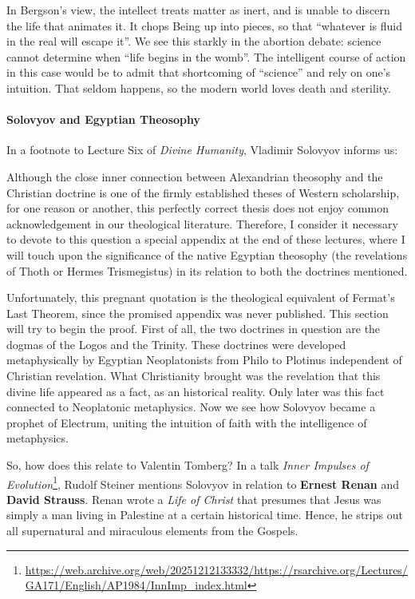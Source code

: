 In Bergson's view, the intellect treats matter as inert, and is unable to discern the life that animates it. It chops Being up into pieces, so that ``whatever is fluid in the real will escape it''. We see this starkly in the abortion debate: science cannot determine when ``life begins in the womb''. The intelligent course of action in this case would be to admit that shortcoming of ``science'' and rely on one's intuition. That seldom happens, so the modern world loves death and sterility.

\paragraph{Solovyov and Egyptian Theosophy}


In a footnote to Lecture Six of \emph{Divine Humanity}, Vladimir Solovyov informs us:

\begin{quotex}
Although the close inner connection between Alexandrian theosophy and the Christian doctrine is one of the firmly established theses of Western scholarship, for one reason or another, this perfectly correct thesis does not enjoy common acknowledgement in our theological literature. Therefore, I consider it necessary to devote to this question a special appendix at the end of these lectures, where I will touch upon the significance of the native Egyptian theosophy (the revelations of Thoth or Hermes Trismegistus) in its relation to both the doctrines mentioned.
\end{quotex}


Unfortunately, this pregnant quotation is the theological equivalent of Fermat's Last Theorem, since the promised appendix was never published. This section will try to begin the proof. First of all, the two doctrines in question are the dogmas of the Logos and the Trinity. These doctrines were developed metaphysically by Egyptian Neoplatonists from Philo to Plotinus independent of Christian revelation. What Christianity brought was the revelation that this divine life appeared as a fact, as an historical reality. Only later was this fact connected to Neoplatonic metaphysics. Now we see how Solovyov became a prophet of Electrum, uniting the intuition of faith with the intelligence of metaphysics.

So, how does this relate to Valentin Tomberg? In a talk \textit{Inner Impulses of Evolution}\footnote{\url{https://web.archive.org/web/20251212133332/https://rsarchive.org/Lectures/GA171/English/AP1984/InnImp_index.html}}, Rudolf Steiner mentions Solovyov in relation to \textbf{Ernest Renan} and \textbf{David Strauss}. Renan wrote a \emph{Life of Christ} that presumes that Jesus was simply a man living in Palestine at a certain historical time. Hence, he strips out all supernatural and miraculous elements from the Gospels.


